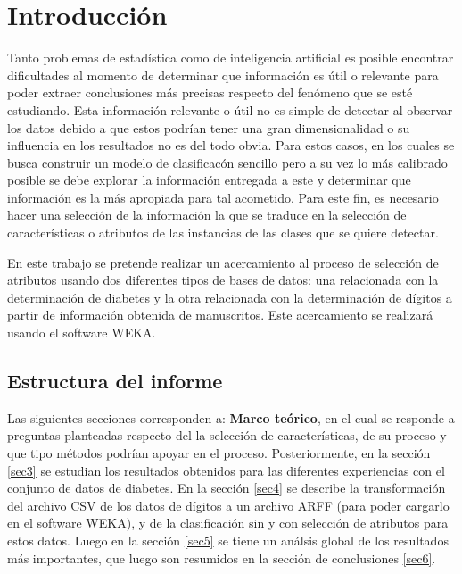 \section{Introducci\'on}
Tanto problemas de estad\'istica como de inteligencia artificial es posible encontrar dificultades al momento de determinar que informaci\'on es \'util o relevante para poder extraer conclusiones m\'as precisas respecto del fen\'omeno que se est\'e estudiando. Esta informaci\'on relevante o \'util no es simple de detectar al observar los datos debido a que estos podr\'ian tener una gran dimensionalidad o su influencia en los resultados no es del todo obvia. Para estos casos, en los cuales se busca construir un modelo de clasificac\'on sencillo pero a su vez lo m\'as calibrado posible se debe explorar la informaci\'on entregada a este y determinar que informaci\'on es la m\'as apropiada para tal acometido. Para este fin, es necesario hacer una selecci\'on de la informaci\'on la que se traduce en la selecci\'on de caracter\'isticas o atributos de las instancias de las clases que se quiere detectar. 
\bigskip

En este trabajo se pretende realizar un acercamiento al proceso de selecci\'on de atributos usando dos diferentes tipos de bases de datos: una relacionada con la determinaci\'on de diabetes y la otra relacionada con la determinaci\'on de d\'igitos a partir de informaci\'on obtenida de manuscritos. Este acercamiento se realizar\'a usando el software WEKA. 

\subsection{Estructura del informe}
Las siguientes secciones corresponden a: \textbf{Marco te\'orico}, en el cual se responde a preguntas planteadas respecto del la selecci\'on de caracter\'isticas, de su proceso y que tipo m\'etodos podr\'ian apoyar en el proceso. Posteriormente, en la secci\'on \ref{sec3} se estudian los resultados obtenidos para las diferentes experiencias con el conjunto de datos de diabetes. En la secci\'on \ref{sec4} se describe la transformaci\'on del archivo CSV de los datos de d\'igitos a un archivo ARFF (para poder cargarlo en el software WEKA), y de la clasificaci\'on sin y con selecci\'on de atributos para estos datos. Luego en la secci\'on \ref{sec5} se tiene un an\'alsis global de los resultados m\'as importantes, que luego son resumidos en la secci\'on de conclusiones \ref{sec6}.  